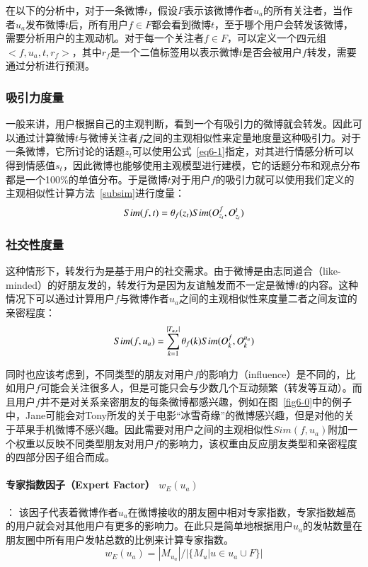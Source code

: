 在以下的分析中，对于一条微博$ t $，假设$ F $表示该微博作者$ u_{a} $的所有关注者，当作者$ u_{a} $发布微博$ t $后，所有用户$ f \in F $都会看到微博$ t $，至于哪个用户会转发该微博，需要分析用户的主观动机。对于每一个关注者$ f \in F $，可以定义一个四元组$ <f, u_{a}, t, r_{f}>  $，其中$ r_{f} $是一个二值标签用以表示微博$ t $是否会被用户$ f $转发，需要通过分析进行预测。

\subsubsection{吸引力度量}
一般来讲，用户根据自己的主观判断，看到一个有吸引力的微博就会转发。因此可以通过计算微博$ t $与微博关注者$ f $之间的主观相似性来定量地度量这种吸引力。对于一条微博，它所讨论的话题$ z_t $可以使用公式~\ref{eq6-1}指定，对其进行情感分析可以得到情感值$ s_t $，因此微博也能够使用主观模型进行建模，它的话题分布和观点分布都是一个100\%的单值分布。于是微博$t$对于用户$f$的吸引力就可以使用我们定义的主观相似性计算方法~\ref{subsim}进行度量：
\begin{equation}
Sim(f,t)=\theta_{f}(z_t)\* Sim(O_{z_t}^{f},O_{z_t}^{t})
\end{equation}

\subsubsection{社交性度量}
这种情形下，转发行为是基于用户的社交需求。由于微博是由志同道合（like-minded）的好朋友发的，转发行为是因为友谊触发而不一定是微博$ t $的内容。这种情况下可以通过计算用户$ f $与微博作者$ u_a $之间的主观相似性来度量二者之间友谊的亲密程度：
\begin{equation}
Sim(f,u_a)=\sum_{k=1}^{|T_{u,v}|}\theta_{f}(k)\* Sim(O_{k}^{f},O_{k}^{u_a})
\end{equation}

同时也应该考虑到，不同类型的朋友对用户$ f $的影响力（influence）是不同的，比如用户$ f $可能会关注很多人，但是可能只会与少数几个互动频繁（转发等互动）。而且用户$ f $并不是对关系亲密朋友的每条微博都感兴趣，例如在图~\ref{fig6-0}中的例子中，Jane可能会对Tony所发的关于电影“冰雪奇缘”的微博感兴趣，但是对他的关于苹果手机微博不感兴趣。因此需要对用户之间的主观相似性$ Sim(f,u_a) $附加一个权重以反映不同类型朋友对用户$ f $的影响力，该权重由反应朋友类型和亲密程度的四部分因子组合而成。

\paragraph{专家指数因子（Expert Factor） $ w_E(u_a) $}： 
该因子代表着微博作者$ u_a $在微博接收的朋友圈中相对专家指数，专家指数越高的用户就会对其他用户有更多的影响力。在此只是简单地根据用户$ u_a $的发帖数量在朋友圈中所有用户发帖总数的比例来计算专家指数。
\begin{equation}
w_E(u_a)=|M_{u_a}|/|\{M_u|u \in u_a \cup F \}|
\end{equation}

